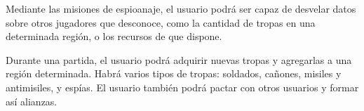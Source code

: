 Mediante las misiones de espioanaje, el usuario podrá ser capaz de desvelar
datos sobre otros jugadores que desconoce, como la cantidad de tropas en una
determinada región, o los recursos de que dispone.

Durante una partida, el usuario podrá adquirir nuevas tropas y agregarlas a una
región determinada. Habrá varios tipos de tropas: soldados, cañones, misiles y
antimisiles, y espías. El usuario también podrá pactar con otros usuarios y
formar así alianzas.